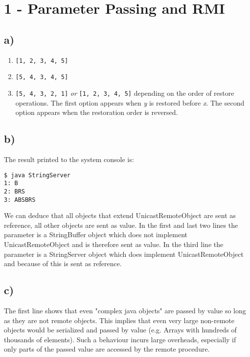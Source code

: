 \documentclass{scrartcl}
\author{Felix Bühler\\2973410 \and Clemens Lieb\\3130838 \and Steffen Wonner\\2862123 \and Fabian Bühler\\2953320}
\title{\gettitle}
\subtitle{\getsubtitle}
\begin{document}
\maketitle

\section*{1 - Parameter Passing and RMI}
\subsection*{a)}
\begin{enumerate}[label=(\roman*)]
	\item \texttt{[1, 2, 3, 4, 5]}
	\item \texttt{[5, 4, 3, 4, 5]}
	\item \texttt{[5, 4, 3, 2, 1]} \emph{or} \texttt{[1, 2, 3, 4, 5]} depending on the order of restore operations.
	The first option appears when \textit{y} is restored before \textit{x}.
	The second option appears when the restoration order is reversed.
\end{enumerate}

\subsection*{b)}

The result printed to the system console is:
\begin{verbatim}
$ java StringServer
1: B
2: BRS
3: ABSBRS
\end{verbatim}

We can deduce that all objects that extend UnicastRemoteObject are sent as reference, all other objects are sent as value.
In the first and last two lines the parameter is a StringBuffer object which does not implement UnicastRemoteObject and is therefore sent as value. 
In the third line the parameter is a StringServer object which does implement UnicastRemoteObject and because of this is sent as reference.

\subsection*{c)}

The first line shows that even "complex java objects" are passed by value so long as they are not remote objects. 
This implies that even very large non-remote objects would be serialized and passed by value (e.g. Arrays with hundreds of thousands of elements).
Such a behaviour incurs large overheads, especially if only parts of the passed value are accessed by the remote procedure.
\end{document}

